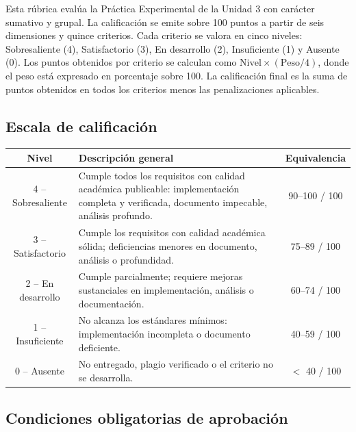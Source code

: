 \documentclass[11pt,a4paper]{article}
\begin{document}
Esta r\'ubrica eval\'ua la Pr\'actica Experimental de la Unidad 3 con car\'acter sumativo y grupal. La calificaci\'on se emite sobre 100 puntos a partir de seis dimensiones y quince criterios. Cada criterio se valora en cinco niveles: Sobresaliente (4), Satisfactorio (3), En desarrollo (2), Insuficiente (1) y Ausente (0). Los puntos obtenidos por criterio se calculan como $\mathrm{Nivel} \times (\mathrm{Peso} / 4)$, donde el peso est\'a expresado en porcentaje sobre 100. La calificaci\'on final es la suma de puntos obtenidos en todos los criterios menos las penalizaciones aplicables.

\subsection{Escala de calificaci\'on}

\begin{tabularx}{\linewidth}{|c|>{\RaggedRight\arraybackslash}X|c|}
    \toprule
    \rowcolor{uteqSoft}
    \textbf{Nivel} & \textbf{Descripci\'on general} & \textbf{Equivalencia}\\
    \midrule
    4 -- Sobresaliente & Cumple todos los requisitos con calidad acad\'emica publicable: implementaci\'on completa y verificada, documento impecable, an\'alisis profundo. & 90--100 / 100\\
    \midrule
    3 -- Satisfactorio & Cumple los requisitos con calidad acad\'emica s\'olida; deficiencias menores en documento, an\'alisis o profundidad. & 75--89 / 100\\
    \midrule
    2 -- En desarrollo & Cumple parcialmente; requiere mejoras sustanciales en implementaci\'on, an\'alisis o documentaci\'on. & 60--74 / 100\\
    \midrule
    1 -- Insuficiente & No alcanza los est\'andares m\'inimos: implementaci\'on incompleta o documento deficiente. & 40--59 / 100\\
    \midrule
    0 -- Ausente & No entregado, plagio verificado o el criterio no se desarrolla. & $<$ 40 / 100\\
    \bottomrule
\end{tabularx}

\subsection{Condiciones obligatorias de aprobaci\'on}
\end{document}

